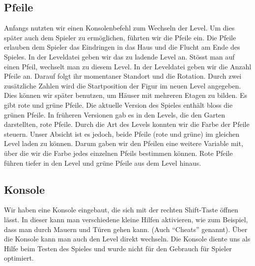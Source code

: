 \documentclass[11pt,a4paper]{scrbook}
\newcommand{\q}[1]{``#1''}
\begin{document}
\subsection{Pfeile}
\label{Pfeile}
Anfangs nutzten wir einen Konsolenbefehl zum Wechseln der Level.
Um dies später auch dem Spieler zu ermöglichen, führten wir die Pfeile ein.
Die Pfeile erlauben dem Spieler das Eindringen in das Haus und die Flucht am Ende des Spieles.
In der Leveldatei geben wir das zu ladende Level an. Stösst man auf einen Pfeil, wechselt man zu diesem Level. In der Leveldatei geben wir die Anzahl Pfeile an. Darauf folgt ihr momentaner Standort und die Rotation. Durch zwei zusätzliche Zahlen wird die Startposition der Figur im neuen Level angegeben. Dies können wir später benutzen, um Häuser mit mehreren Etagen zu bilden.
Es gibt rote und grüne Pfeile. 
Die aktuelle Version des Spieles enthält bloss die grünen Pfeile.
In früheren Versionen gab es in den Levels, die den Garten darstellten, rote Pfeile.
Durch die Art des Levels konnten wir die Farbe der Pfeile steuern.
Unser Absicht ist es jedoch, beide Pfeile (rote und grüne) im gleichen Level laden zu können.
Darum gaben wir den Pfeilen eine weitere Variable mit, über die wir die Farbe jedes einzelnen Pfeils bestimmen können.
Rote Pfeile führen tiefer in den Level und grüne Pfeile aus dem Level hinaus.

\subsection{Konsole}
Wir haben eine Konsole eingebaut, die sich mit der rechten Shift-Taste öffnen lässt. 
In dieser kann man verschiedene kleine Hilfen aktivieren, 
wie zum Beispiel, dass man durch Mauern und Türen gehen kann. (Auch \q{Cheats} genannt). 
Über die Konsole kann man auch den Level direkt wechseln.
Die Konsole diente uns als Hilfe beim Testen des Spieles und wurde nicht für den Gebrauch für Spieler optimiert.
\end{document}
